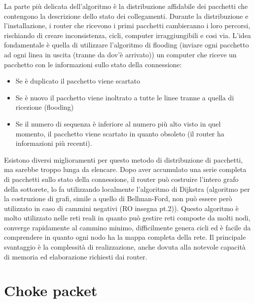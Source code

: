 La parte più delicata dell’algoritmo è la distribuzione affidabile dei pacchetti che contengono la descrizione dello stato dei collegamenti. Durante la distribuzione e l’installazione, i router che ricevono i primi pacchetti cambieranno i loro percorsi, rischiando di creare inconsistenza, cicli, computer irraggiungibili e cosi via. L’idea fondamentale è quella di utilizzare l’algoritmo di flooding (inviare ogni pacchetto ad ogni linea in uscita (tranne da dov’è arrivato)) un computer che riceve un pacchetto con le informazioni sullo stato della connessione:
\begin{itemize}
\item	Se è duplicato il pacchetto viene scartato
\item	Se è nuovo il pacchetto viene inoltrato a tutte le linee tranne a quella di ricezione (flooding)
\item	Se il numero di sequenza è inferiore al numero più alto visto in quel momento, il pacchetto viene scartato in quanto obsoleto (il router ha informazioni più recenti).
\end{itemize}
Esistono diversi miglioramenti per questo metodo di distribuzione di pacchetti, ma sarebbe troppo lunga da elencare.
Dopo aver accumulato una serie completa di pacchetti sullo stato della connessione, il router può costruire l’intero grafo della sottorete, lo fa utilizzando localmente l’algoritmo di Dijkstra (algoritmo per la costruzione di grafi, simile a quello di Bellman-Ford, non può essere però utilizzato in caso di cammini negativi (RO insegna pt.2)).
Questo algoritmo è molto utilizzato nelle reti reali in quanto può gestire reti composte da molti nodi, converge rapidamente al cammino minimo, difficilmente genera cicli ed è facile da comprendere in quanto ogni nodo ha la mappa completa della rete. Il principale svantaggio è la complessità di realizzazione, anche dovuta alla notevole capacità di memoria ed elaborazione richiesti dai router.
\section{Choke packet}

